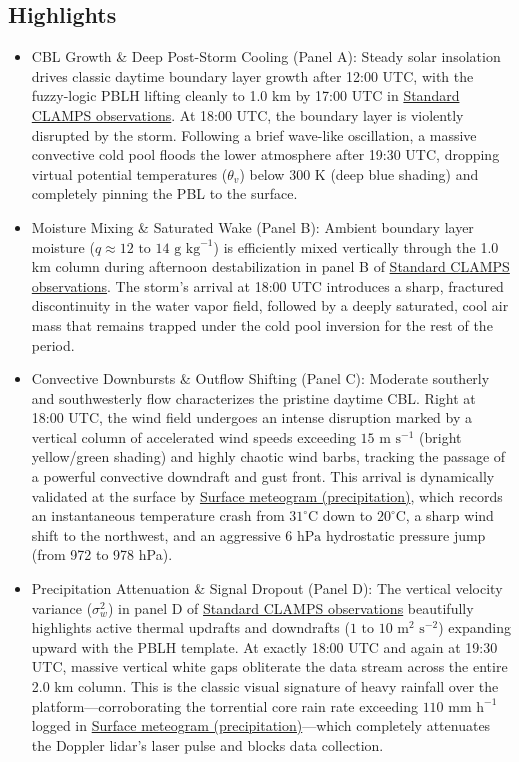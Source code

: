 \documentclass[11pt]{article}
\begin{document}
\subsection*{Highlights}
\begin{itemize}
  \item CBL Growth \& Deep Post-Storm Cooling (Panel A): Steady solar insolation drives classic daytime boundary layer growth after 12:00 UTC, with the fuzzy-logic PBLH lifting cleanly to 1.0 km by 17:00 UTC in \hyperref[fig:ci_c2:ci_c2_instrument_template_4panel]{Standard CLAMPS observations}. At 18:00 UTC, the boundary layer is violently disrupted by the storm. Following a brief wave-like oscillation, a massive convective cold pool floods the lower atmosphere after 19:30 UTC, dropping virtual potential temperatures ($\theta_v$) below $300\text{ K}$ (deep blue shading) and completely pinning the PBL to the surface.
  \item Moisture Mixing \& Saturated Wake (Panel B): Ambient boundary layer moisture ($q \approx 12\text{ to }14\text{ g kg}^{-1}$) is efficiently mixed vertically through the 1.0 km column during afternoon destabilization in panel B of \hyperref[fig:ci_c2:ci_c2_instrument_template_4panel]{Standard CLAMPS observations}. The storm's arrival at 18:00 UTC introduces a sharp, fractured discontinuity in the water vapor field, followed by a deeply saturated, cool air mass that remains trapped under the cold pool inversion for the rest of the period.
  \item Convective Downbursts \& Outflow Shifting (Panel C): Moderate southerly and southwesterly flow characterizes the pristine daytime CBL. Right at 18:00 UTC, the wind field undergoes an intense disruption marked by a vertical column of accelerated wind speeds exceeding $15\text{ m s}^{-1}$ (bright yellow/green shading) and highly chaotic wind barbs, tracking the passage of a powerful convective downdraft and gust front. This arrival is dynamically validated at the surface by \hyperref[fig:ci_c2:ci_c2_aux_surface_meteogram]{Surface meteogram (precipitation)}, which records an instantaneous temperature crash from $31^\circ\text{C}$ down to $20^\circ\text{C}$, a sharp wind shift to the northwest, and an aggressive $6\text{ hPa}$ hydrostatic pressure jump (from 972 to 978 hPa).
  \item Precipitation Attenuation \& Signal Dropout (Panel D): The vertical velocity variance ($\sigma_w^2$) in panel D of \hyperref[fig:ci_c2:ci_c2_instrument_template_4panel]{Standard CLAMPS observations} beautifully highlights active thermal updrafts and downdrafts ($1\text{ to }10\text{ m}^2\text{ s}^{-2}$) expanding upward with the PBLH template. At exactly 18:00 UTC and again at 19:30 UTC, massive vertical white gaps obliterate the data stream across the entire 2.0 km column. This is the classic visual signature of heavy rainfall over the platform—corroborating the torrential core rain rate exceeding $110\text{ mm h}^{-1}$ logged in \hyperref[fig:ci_c2:ci_c2_aux_surface_meteogram]{Surface meteogram (precipitation)}—which completely attenuates the Doppler lidar's laser pulse and blocks data collection.
\end{itemize}
\end{document}
